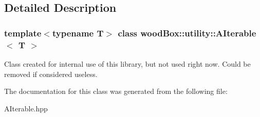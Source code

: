 \subsection{Detailed Description}
\subsubsection*{template$<$typename T$>$\newline
class wood\+Box\+::utility\+::\+A\+Iterable$<$ T $>$}

Class created for internal use of this library, but not used right now. Could be removed if considered useless. 

The documentation for this class was generated from the following file\+:\begin{DoxyCompactItemize}
\item 
A\+Iterable.\+hpp\end{DoxyCompactItemize}
